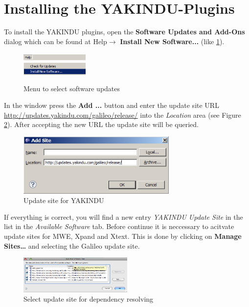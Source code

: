\section{Installing the YAKINDU-Plugins}

To install the YAKINDU plugins, open the \textbf{Software Updates and Add-Ons}
dialog which can be found at Help$\rightarrow$ \textbf{Install New Software...} (like
\ref{fig:updatesMenu}). \begin{figure}[ht] \center
\includegraphics[width=0.3\textwidth]{Pictures/helpMenu}\\
\includegraphics[width=0.3\textwidth]{Pictures/softwareUpdates}
\caption{\label{fig:updatesMenu}Menu to select software updates} 
\end{figure}
In the window press the \textbf{Add ...} button and enter the update site URL
\url{http://updates.yakindu.com/galileo/release/}
into the \textit{Location} area (see Figure \ref{fig:updateSite}). After
accepting the new URL the update site will be queried.

\begin{figure}[ht]
\center
\includegraphics[width=0.7\textwidth]{./Pictures/updateSite}
\caption{\label{fig:updateSite}Update site for YAKINDU} 
\end{figure}

If everything is correct, you will find a new entry \textit{YAKINDU Update Site}
in the list in the \textit{Available Software} tab. Before continue it is
neccessary to acitvate update sites for MWE, Xpand and Xtext. This is
done by clicking on \textbf{Manage Sites\dots} and selecting the Galileo update site.
\begin{figure}[ht]
\center \includegraphics[width=0.5\textwidth]{./Pictures/manageSites}
\caption{\label{fig:manageSites}Select update site for dependency resolving} 
\end{figure}

